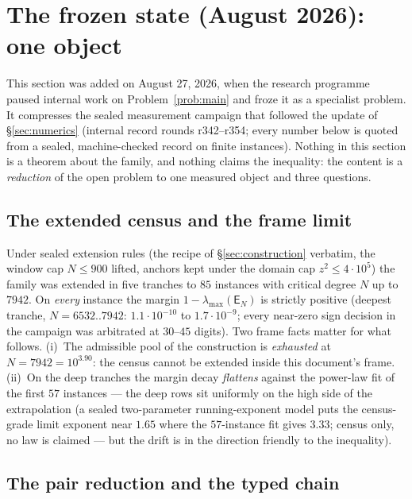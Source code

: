 \documentclass[11pt]{article}
\theoremstyle{remark}
\newcommand{\E}{\mathsf{E}}
\begin{document}
\section{The frozen state (August 2026): one object}\label{sec:frozen}

This section was added on August 27, 2026, when the research
programme paused internal work on Problem~\ref{prob:main} and froze
it as a specialist problem.  It compresses the sealed measurement
campaign that followed the update of \S\ref{sec:numerics} (internal
record rounds r342--r354; every number below is quoted from a sealed,
machine-checked record on finite instances).  Nothing in this section
is a theorem about the family, and nothing claims the inequality:
the content is a \emph{reduction} of the open problem to one measured
object and three questions.

\subsection{The extended census and the frame limit}
\label{sec:frozen-census}

Under sealed extension rules (the recipe of \S\ref{sec:construction}
verbatim, the window cap $N\le 900$ lifted, anchors kept under the
domain cap $z^{2}\le 4\cdot10^{5}$) the family was extended in five
tranches to $85$ instances with critical degree $N$ up to $7942$.
On \emph{every} instance the margin $1-\lambda_{\max}(\E_{N})$ is
strictly positive (deepest tranche, $N=6532..7942$:
$1.1\cdot10^{-10}$ to $1.7\cdot10^{-9}$; every near-zero sign
decision in the campaign was arbitrated at $30$--$45$ digits).  Two
frame facts matter for what follows.  (i)~The admissible pool of the
construction is \emph{exhausted} at $N=7942=10^{3.90}$: the census
cannot be extended inside this document's frame.  (ii)~On the deep
tranches the margin decay \emph{flattens} against the power-law fit
of the first $57$ instances --- the deep rows sit uniformly on the
high side of the extrapolation (a sealed two-parameter
running-exponent model puts the census-grade limit exponent near
$1.65$ where the $57$-instance fit gives $3.33$; census only, no law
is claimed --- but the drift is in the direction friendly to the
inequality).

\subsection{The pair reduction and the typed chain}
\label{sec:frozen-chain}
\end{document}
